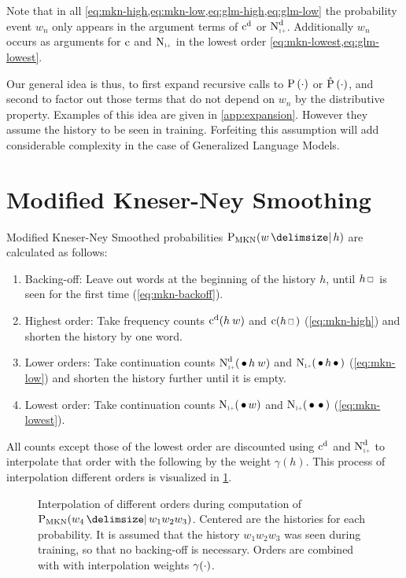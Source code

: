 Note that in all \cref{eq:mkn-high,eq:mkn-low,eq:glm-high,eq:glm-low} the
probability event $w_n$ only appears in the argument terms of
$\DiscountedCount$ or $\DiscountedCount*$.
Additionally $w_n$ occurs as arguments for $\operatorname{c}$ and $\ContCountIp$ in the
lowest order \cref{eq:mkn-lowest,eq:glm-lowest}.

Our general idea is thus, to first expand recursive calls to
$\Prob(\DummyArg)$ or $\Prob*(\DummyArg)$, and second to factor
out those terms that do not depend on $w_n$ by the distributive property.
Examples of this idea are given in \cref{app:expansion}.
However they assume the history to be seen in training.
Forfeiting this assumption will add considerable complexity in the case
of Generalized Language Models.

\clearpage %
\section{Modified Kneser-Ney Smoothing}

Modified Kneser-Ney Smoothed probabilities $\ProbMKN{w}{h}$ are calculated as
follows:
\begin{enumerate}
  \item Backing-off: Leave out words at the beginning of the history $h$, until
    $h \Skp$ is seen for the first time (\cref{eq:mkn-backoff}).
  \item Highest order: Take frequency counts $\DiscountedCount(h \: w)$ and
    $\Count(h \Skp)$ (\cref{eq:mkn-high}) and shorten the history by one word.
  \item Lower orders: Take continuation counts $\DiscountedCount*(\WSkp h \: w)$
    and $\ContCountIp(\WSkp h \WSkp)$ (\cref{eq:mkn-low}) and shorten the
    history further until it is empty.
  \item Lowest order: Take continuation counts $\ContCountIp(\WSkp w)$ and
    $\ContCountIp(\WSkp \WSkp)$ (\cref{eq:mkn-lowest}).
\end{enumerate}
All counts except those of the lowest order are discounted using
$\DiscountedCount$ and $\DiscountedCount*$ to interpolate that order with the
following by the weight $\gamma(h)$.
This process of interpolation different orders is visualized in
\cref{fig:history-mkn}.

\begin{figure}
  \centering
  
  \caption{
    Interpolation of different orders during computation of
    $\ProbMKN{w_4}{w_1 w_2 w_3}$.
    Centered are the histories for each probability.
    It is assumed that the history $w_1 w_2 w_3$ was seen during training, so
    that no backing-off is necessary.
    Orders are combined with with interpolation weights $\gamma(\cdot)$.
  }
  \label{fig:history-mkn}
\end{figure}

